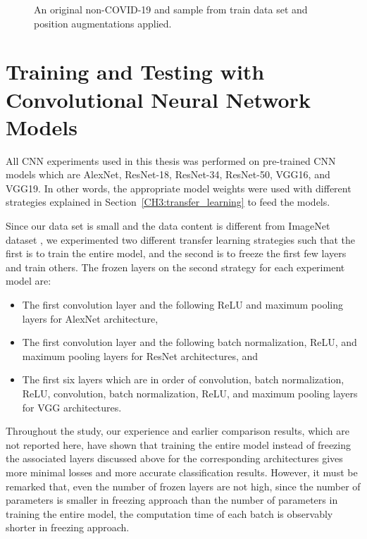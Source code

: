 \begin{figure}[h]
	\caption{An original non-COVID-19 and sample from train data set and position augmentations applied.}
	\label{augmented_sample}
\end{figure}

\newpage

\section{Training and Testing with Convolutional Neural Network Models}\label{sec:CH5_cnn_experiments}

All CNN experiments used in this thesis was performed on pre-trained CNN models which are AlexNet, ResNet-18, ResNet-34, ResNet-50, VGG16, and VGG19. In other words, the appropriate model weights were used with different strategies explained in Section~\ref{CH3:transfer_learning} to feed the models.

Since our data set is small and the data content is different from ImageNet dataset \cite{imagenet}, we experimented two different transfer learning strategies such that the first is to train the entire model, and the second is to freeze the first few layers and train others. The frozen layers on the second strategy for each experiment model are:

\begin{itemize}
	\item The first convolution layer and the following ReLU and maximum pooling layers for AlexNet architecture,
	\item The first convolution layer and the following batch normalization, ReLU, and maximum pooling layers for ResNet architectures, and
	\item The first six layers which are in order of convolution, batch normalization, ReLU, convolution, batch normalization, ReLU, and maximum pooling layers for VGG architectures.
\end{itemize}

Throughout the study, our experience and earlier comparison results, which are not reported here, have shown that training the entire model instead of freezing the associated layers discussed above for the corresponding architectures gives more minimal losses and more accurate classification results. However, it must be remarked that, even the number of frozen layers are not high, since the number of parameters is smaller in freezing approach than the number of parameters in training the entire model, the computation time of each batch is observably shorter in freezing approach.


